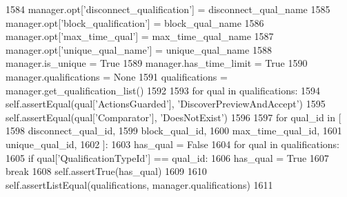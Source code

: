 \begin{DoxyCode}
1584         manager.opt[\textcolor{stringliteral}{'disconnect\_qualification'}] = disconnect\_qual\_name
1585         manager.opt[\textcolor{stringliteral}{'block\_qualification'}] = block\_qual\_name
1586         manager.opt[\textcolor{stringliteral}{'max\_time\_qual'}] = max\_time\_qual\_name
1587         manager.opt[\textcolor{stringliteral}{'unique\_qual\_name'}] = unique\_qual\_name
1588         manager.is\_unique = \textcolor{keyword}{True}
1589         manager.has\_time\_limit = \textcolor{keyword}{True}
1590         manager.qualifications = \textcolor{keywordtype}{None}
1591         qualifications = manager.get\_qualification\_list()
1592 
1593         \textcolor{keywordflow}{for} qual \textcolor{keywordflow}{in} qualifications:
1594             self.assertEqual(qual[\textcolor{stringliteral}{'ActionsGuarded'}], \textcolor{stringliteral}{'DiscoverPreviewAndAccept'})
1595             self.assertEqual(qual[\textcolor{stringliteral}{'Comparator'}], \textcolor{stringliteral}{'DoesNotExist'})
1596 
1597         \textcolor{keywordflow}{for} qual\_id \textcolor{keywordflow}{in} [
1598             disconnect\_qual\_id,
1599             block\_qual\_id,
1600             max\_time\_qual\_id,
1601             unique\_qual\_id,
1602         ]:
1603             has\_qual = \textcolor{keyword}{False}
1604             \textcolor{keywordflow}{for} qual \textcolor{keywordflow}{in} qualifications:
1605                 \textcolor{keywordflow}{if} qual[\textcolor{stringliteral}{'QualificationTypeId'}] == qual\_id:
1606                     has\_qual = \textcolor{keyword}{True}
1607                     \textcolor{keywordflow}{break}
1608             self.assertTrue(has\_qual)
1609 
1610         self.assertListEqual(qualifications, manager.qualifications)
1611 
\end{DoxyCode}
\mbox{\label{classparlai_1_1mturk_1_1core_1_1legacy__2018_1_1test_1_1test__mturk__manager_1_1TestMTurkManagerConnectedFunctions_a6c780a05e1a71e8e173ad8b7a76082ae}} 
